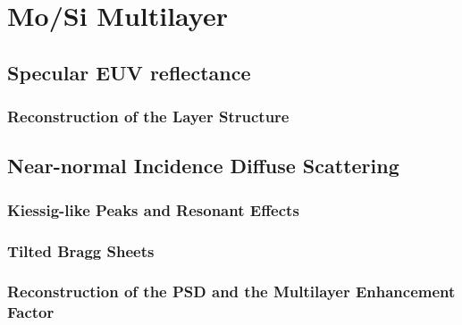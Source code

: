 \chapter{Mo/Si Multilayer}

\section{Specular EUV reflectance}

\subsection{Reconstruction of the Layer Structure}

\section{Near-normal Incidence Diffuse Scattering}

\subsection{Kiessig-like Peaks and Resonant Effects}

\subsection{Tilted Bragg Sheets}

\subsection{Reconstruction of the PSD and the Multilayer Enhancement Factor}
